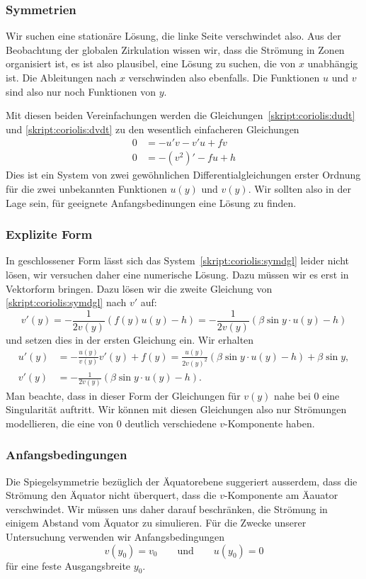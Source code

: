\subsubsection{Symmetrien}
Wir suchen eine stationäre Lösung, die linke Seite verschwindet also.
Aus der Beobachtung der globalen Zirkulation wissen wir, dass die
Strömung in Zonen organisiert ist, es ist also plausibel, eine
Lösung zu suchen, die von $x$ unabhängig ist.
Die Ableitungen nach $x$ verschwinden also ebenfalls.
Die Funktionen $u$ und $v$ sind also nur noch Funktionen von $y$.

Mit diesen beiden Vereinfachungen werden die
Gleichungen~\eqref{skript:coriolis:dudt}
und
\eqref{skript:coriolis:dvdt}
zu den wesentlich einfacheren Gleichungen
\begin{equation}
\begin{aligned}
0&=-u'v-v'u+fv
\\
0&=-(v^2)' - fu +h
\end{aligned}
\label{skript:coriolis:symdgl}
\end{equation}
Dies ist ein System von zwei gewöhnlichen Differentialgleichungen
erster Ordnung für die zwei unbekannten Funktionen $u(y)$ und $v(y)$.
Wir sollten also in der Lage sein, für geeignete Anfangsbedinungen eine 
Lösung zu finden.

\subsubsection{Explizite Form}
In geschlossener Form lässt sich das System~\eqref{skript:coriolis:symdgl}
leider nicht lösen, wir versuchen daher eine numerische Lösung.
Dazu müssen wir es erst in Vektorform bringen.
Dazu lösen wir die zweite Gleichung von \eqref{skript:coriolis:symdgl}
nach $v'$ auf:
\[
v'(y)
=
-\frac{1}{2v(y)}(f(y)u(y)-h)
=
-\frac{1}{2v(y)}(\beta\sin y\cdot u(y)-h)
\]
und setzen dies in der ersten Gleichung ein.
Wir erhalten
\begin{align}
u'(y)
&=
-\frac{u(y)}{v(y)}v'(y)+f(y)
=
\frac{u(y)}{2v(y)^2} (\beta\sin y\cdot u(y)-h) + \beta \sin y,
\label{skript:coriolis:udgl}
\\
v'(y)
&=
-\frac{1}{2v(y)}(\beta\sin y\cdot u(y)-h).
\label{skript:coriolis:vdgl}
\end{align}
Man beachte, dass in dieser Form der Gleichungen für $v(y)$ nahe bei $0$
eine Singularität auftritt.
Wir können mit diesen Gleichungen also nur Strömungen modellieren, die
eine von $0$ deutlich verschiedene $v$-Komponente haben.

\subsubsection{Anfangsbedingungen}
Die Spiegelsymmetrie bezüglich der Äquatorebene suggeriert ausserdem, dass
die Strömung den Äquator nicht überquert, dass die $v$-Komponente
am Äauator verschwindet.
Wir müssen uns daher darauf beschränken, die Strömung in einigem
Abstand vom Äquator zu simulieren.
Für die Zwecke unserer Untersuchung verwenden wir Anfangsbedingungen
\[
v(y_0)=v_0
\qquad
\text{und}
\qquad
u(y_0)=0
\]
für eine feste Ausgangsbreite $y_0$.

